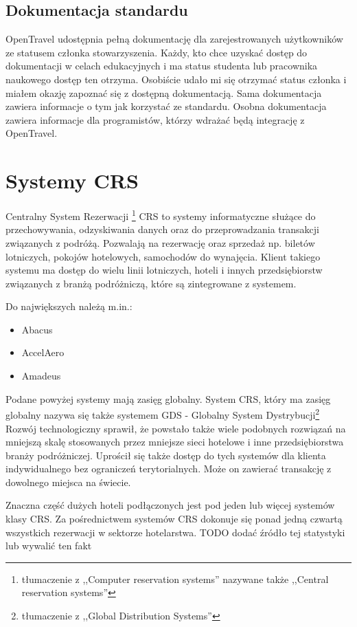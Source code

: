 \documentclass[a4paper,onecolumn,oneside,11pt,wide,floatssmall]{mwrep}
\theoremstyle{definition}
\theoremstyle{plain}%
\theoremstyle{remark}
\begin{document}
\subsection{Dokumentacja standardu}
OpenTravel udostępnia pełną dokumentację dla zarejestrowanych użytkowników 
ze statusem członka stowarzyszenia. Każdy, kto chce uzyskać dostęp do 
dokumentacji w celach edukacyjnych i ma status studenta lub pracownika 
naukowego dostęp ten otrzyma. Osobiście udało mi się otrzymać status członka 
i miałem okazję zapoznać się z dostępną dokumentacją.
Sama dokumentacja zawiera informacje o tym jak korzystać ze standardu. 
Osobna dokumentacja zawiera informacje dla programistów, którzy wdrażać będą 
integrację z OpenTravel.

\section{Systemy CRS}
\label{system-crs}
Centralny System Rezerwacji \footnote{tłumaczenie z ,,Computer reservation 
systems'' nazywane także ,,Central reservation systems''} CRS to systemy 
informatyczne służące do przechowywania, odzyskiwania danych oraz do 
przeprowadzania transakcji związanych z podróżą. Pozwalają na rezerwację 
oraz sprzedaż np. biletów lotniczych, pokojów hotelowych, samochodów do 
wynajęcia. Klient takiego systemu ma dostęp do wielu linii lotniczych, 
hoteli i innych przedsiębiorstw związanych z branżą podróżniczą, które są 
zintegrowane z systemem.

Do największych należą m.in.:
\begin{itemize}
\item Abacus
\item AccelAero
\item Amadeus
\end{itemize}

Podane powyżej systemy mają zasięg globalny. System CRS, który ma zasięg 
globalny nazywa się także systemem GDS - Globalny System Dystrybucji\footnote
{tłumaczenie z ,,Global Distribution Systems''} Rozwój technologiczny 
sprawił, że powstało także wiele podobnych rozwiązań na mniejszą skalę 
stosowanych przez mniejsze sieci hotelowe i inne przedsiębiorstwa branży 
podróżniczej. Uprościł się także dostęp do tych systemów dla klienta 
indywidualnego bez ograniczeń terytorialnych. Może on zawierać transakcję z 
dowolnego miejsca na świecie.

Znaczna część dużych hoteli podłączonych jest pod jeden lub więcej systemów 
klasy CRS.
Za pośrednictwem systemów CRS dokonuje się ponad jedną czwartą wszystkich 
rezerwacji w sektorze hotelarstwa.
TODO dodać źródło tej statystyki lub wywalić ten fakt
\end{document}
